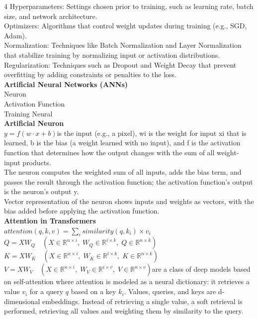 \documentclass[8pt]{extarticle}
\begin{document}
\begin{multicols}{4}
Hyperparameters: Settings chosen prior to training, such as learning rate, batch size, and network architecture.\\
Optimizers: Algorithms that control weight updates during training (e.g., SGD, Adam).\\
Normalization: Techniques like Batch Normalization and Layer Normalization that stabilize training by normalizing input or activation distributions.\\
Regularization: Techniques such as Dropout and Weight Decay that prevent overfitting by adding constraints or penalties to the loss.\\
\vspace{2pt}\textbf{Artificial Neural Networks (ANNs)}\\
Neuron\\
Activation Function\\
Training Neural\\
\vspace{2pt}\textbf{Artificial Neuron}\\
$y = f(w \cdot x + b)$\xi is the input (e.g., a pixel), wi is the weight for input xi that is learned, b is the bias (a weight learned with no input), and f is the activation function that determines how the output changes with the sum of all weight-input products.\\
The neuron computes the weighted sum of all inputs, adds the bias term, and passes the result through the activation function; the activation function's output is the neuron's output y.\\
Vector representation of the neuron shows inputs and weights as vectors, with the bias added before applying the activation function.\\
\vspace{2pt}\textbf{Attention in Transformers}\\
$attention(q, k, v) = \sum_i similarity(q, k_i) \times v_i$\\
$Q = X W_Q \quad (X \in \mathbb{R}^{n\times i},\; W_Q \in \mathbb{R}^{i\times k},\; Q \in \mathbb{R}^{n\times k})$\\
$K = X W_K \quad (X \in \mathbb{R}^{n\times i},\; W_K \in \mathbb{R}^{i\times k},\; K \in \mathbb{R}^{n\times k})$\\
$V = X W_V \quad (X \in \mathbb{R}^{n\times i},\; W_V \in \mathbb{R}^{i\times v},\; V \in \mathbb{R}^{n\times v})$\Transformers are a class of deep models based on self-attention where attention is modeled as a neural dictionary: it retrieves a value $v_i$ for a query $ q$ based on a key $ k_i$. Values, queries, and keys are d-dimensional embeddings. Instead of retrieving a single value, a soft retrieval is performed, retrieving all values and weighting them by similarity to the query.\\

\end{multicols}
\end{document}
